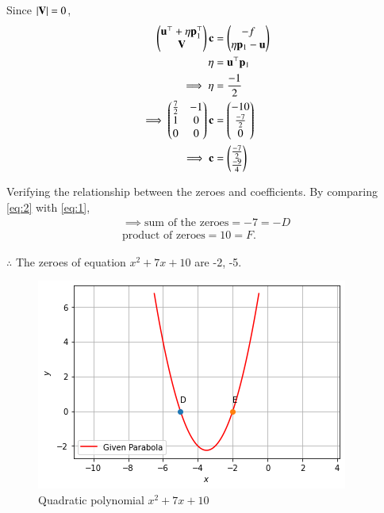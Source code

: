 \documentclass[journal,12pt,twocolumn]{IEEEtran}
\begin{document}
Since $\vert\mathbf{V}\vert = 0$,
\begin{align}
    \begin{pmatrix}\mathbf{u}^\top+\eta \mathbf{p}_1^\top\\\mathbf{V}\end{pmatrix}\mathbf{c} &= \begin{pmatrix}-f\\\eta \mathbf{p}_1-\mathbf{u}\end{pmatrix}\\
    \eta &= \mathbf{u}^\top \mathbf{p}_1\\
    \implies \eta &= \frac{-1}{2}\\
    \implies \begin{pmatrix}\frac{7}{2}&-1\\1&0\\0&0\end{pmatrix}\mathbf{c} &= \begin{pmatrix}-10\\\frac{-7}{2}\\0\end{pmatrix}\\
    \implies \mathbf{c} &= \begin{pmatrix}\frac{-7}{2}\\\frac{-9}{4}\end{pmatrix}
\end{align}

Verifying the relationship between the zeroes and coefficients. By comparing \eqref{eq:2} with \eqref{eq:1},
\begin{align}
    \implies \text{sum of the zeroes} = -7 = -D\\
    \text{product of zeroes} = 10 = F.
\end{align}

$\therefore$ The zeroes of equation $x^2+7x+10$ are -2, -5.


\begin{figure}[htp]
    \centering
    \includegraphics[width=\columnwidth]{a_5_final.png}
    \caption{Quadratic polynomial $x^2+7x+10$}
    \label{fig:my_label}
\end{figure}
\end{document}
